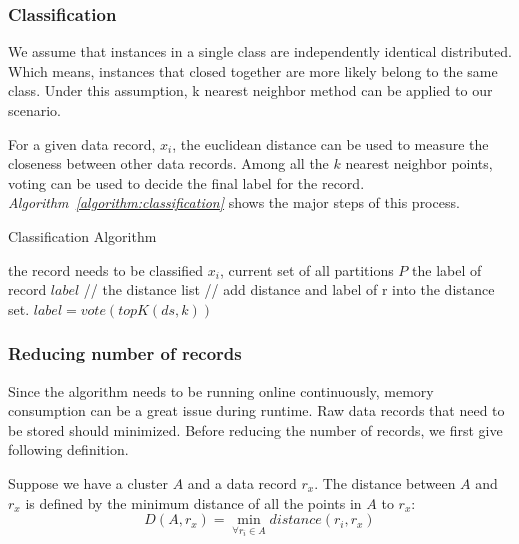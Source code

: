 \documentclass[runningheads]{llncs}
\begin{document}
	\subsubsection{Classification}
	
	We assume that instances in a single class are independently identical distributed. Which means, instances that closed together are more likely belong to the same class. Under this assumption, k nearest neighbor method can be applied to our scenario.
	
	For a given data record, $x_i$, the euclidean distance can be used to measure the closeness between other data records. Among all the $k$ nearest neighbor points, voting can be used to decide the final label for the record. \textit{Algorithm~\ref{algorithm:classification}} shows the major steps of this process.
	
	\begin{algorithm}
		\caption{Classification Algorithm} \label{algorithm:classification}
		\begin{algorithmic}
			\REQUIRE the record needs to be classified $x_i$, current set of all partitions $P$
			\ENSURE the label of record $label$
			 // the distance list
			 // add distance and label of r into the distance set.
			\STATE $label = vote(topK(ds, k))$
			\ENDFOR
			\ENDFOR
		\end{algorithmic}
	\end{algorithm}
	
	\subsubsection{Reducing number of records}
	Since the algorithm needs to be running online continuously, memory consumption can be a great issue during runtime. Raw data records that need to be stored should minimized. Before reducing the number of records, we first give following definition.
	
	\begin{definition}
		
		Suppose we have a cluster $A$ and a data record $r_x$. The distance between $A$ and $r_x$ is defined by the minimum distance of all the points in $A$ to $r_x$:
		\begin{displaymath}
		D(A, r_x) = \min_{\forall r_i \in A} distance(r_i, r_x) 
		\end{displaymath}
	\end{definition}
	
\end{document}
